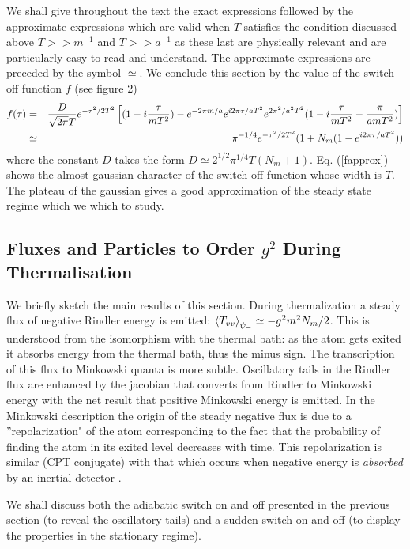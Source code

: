 We shall give throughout the text the exact expressions followed
by the approximate  expressions which are valid when $T$
satisfies the condition discussed above $T>> m^{-1}$ and $T>> a^{-1}$
as these
last are physically relevant  and are particularly easy to read and understand.
The approximate expressions are preceded by the symbol $\simeq$.
We conclude this section by the value of the switch off function $f$
(see figure 2)
\begin{eqnarray}
f(\tau) &=&
{D \over \sqrt{2 \pi} T} e^{-\tau^2/2 T^2} \left[
(1 - i {\tau \over mT^2})
- e^{- 2 \pi m/ a} e^{i 2 \pi \tau / a T^2} e^{2 \pi^2 / a^2 T^2}
(1 - i {\tau \over mT^2} - {\pi \over a m T^2})\right]
\nonumber\\
&\simeq &\pi^{-1/4}  e^{-\tau^2/2 T^2}
( 1+ N_m(1 - e^{i 2 \pi \tau / a T^2}))
\label{fapprox}
\end{eqnarray}
where the constant $D$ takes the form $ D \simeq
 2^{1/2}\pi^{1/4} T (N_m + 1)$.
Eq. (\ref{fapprox}) shows the almost gaussian character of the switch off
function whose width is $T$.
The plateau of the gaussian gives a good approximation of the steady state
regime which we which to study.

\subsection{Fluxes and Particles to Order $g^2$ During Thermalisation}

We briefly sketch the main results of this section.
During thermalization a
steady flux of negative Rindler energy is emitted:
  $\mbox{$ \langle  T_{vv} \rangle $}_{\psi_-} \simeq - g^2 m^2
N_m /2$. This is understood from the isomorphism \cite{Grove}
 with the thermal bath: as the
atom gets exited it absorbs energy from the thermal bath, thus the minus sign.
The transcription of this flux to Minkowski quanta is more subtle. Oscillatory
tails in the Rindler flux are enhanced by the jacobian that converts from
Rindler to Minkowski energy with the net result that positive Minkowski energy
is emitted.
In the Minkowski description the origin of
the steady negative flux is due to a ''repolarization"
of the atom corresponding to
the fact that the probability of finding the atom in its exited level
decreases with time. This repolarization is similar (CPT conjugate)
 with that which occurs
when negative energy is {\it absorbed} by an inertial detector \cite{Grove2}.

We shall discuss both the adiabatic switch on and off presented in
the previous section (to reveal the oscillatory tails)
 and  a sudden switch on and off (to display the properties in the
stationary
regime).

